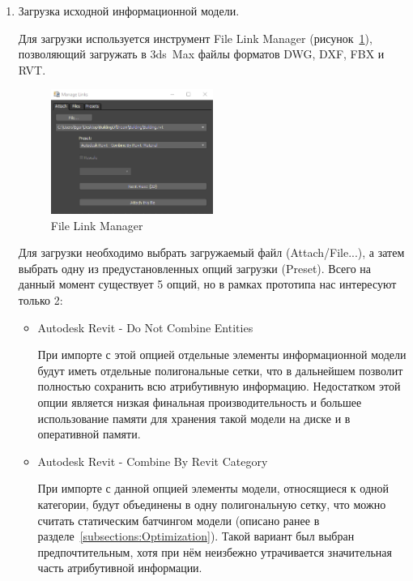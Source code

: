 \begin{enumerate}
    \item {
        Загрузка исходной информационной модели.

        Для загрузки используется инструмент File Link Manager
        (рисунок~\ref{figure:3DCMax-FileLinkManager}),
        позволяющий загружать в 3ds~Max файлы форматов DWG, DXF, FBX и RVT.
        \begin{figure}[!htp]
            \centering
            \includegraphics[width=0.5\textwidth, frame]{images/3DSMax-FLM.png}
            \caption{File Link Manager}
            \label{figure:3DCMax-FileLinkManager}
        \end{figure}
        Для загрузки необходимо выбрать загружаемый файл (Attach/File...),
        а затем выбрать одну из предустановленных опций загрузки (Preset).
        Всего на данный момент существует 5 опций,
        но в рамках прототипа нас интересуют только 2:

        \begin{itemize}
            \item {
                Autodesk Revit - Do Not Combine Entities

                При импорте с этой опцией отдельные элементы информационной модели
                будут иметь отдельные полигональные сетки, что в дальнейшем
                позволит полностью сохранить всю атрибутивную информацию.
                Недостатком этой опции является низкая финальная производительность
                и большее использование памяти для хранения такой модели
                на диске и в оперативной памяти.
            }
            \item {
                Autodesk Revit - Combine By Revit Category

                При импорте с данной опцией элементы модели, относящиеся к одной категории,
                будут объединены в одну полигональную сетку, что можно считать
                статическим батчингом модели (описано ранее
                в разделе~\ref{subsections:Optimization}).
                Такой вариант был выбран предпочтительным,
                хотя при нём неизбежно утрачивается
                значительная часть атрибутивной информации.
            }
        \end{itemize}

}
\end{enumerate}
